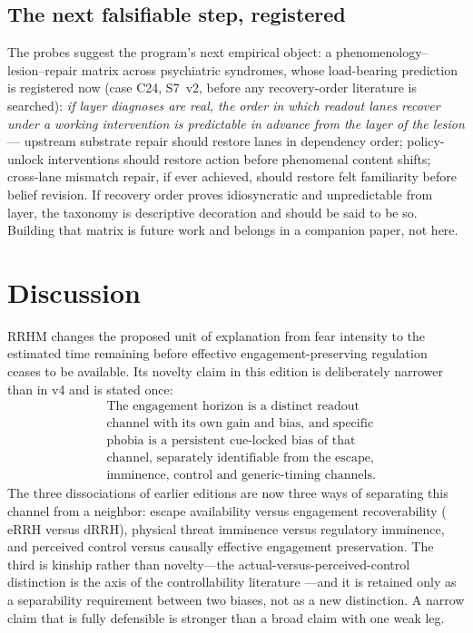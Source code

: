 \documentclass[9pt,twocolumn]{article}
\newcommand{\eRRH}{\mathrm{eRRH}}
\newcommand{\dRRH}{\mathrm{dRRH}}
\begin{document}
\subsection{The next falsifiable step, registered}
The probes suggest the program's next empirical object: a phenomenology--lesion--repair matrix across psychiatric syndromes, whose load-bearing prediction is registered now (case C24, S7~v2, before any recovery-order literature is searched): \emph{if layer diagnoses are real, the order in which readout lanes recover under a working intervention is predictable in advance from the layer of the lesion} --- upstream substrate repair should restore lanes in dependency order; policy-unlock interventions should restore action before phenomenal content shifts; cross-lane mismatch repair, if ever achieved, should restore felt familiarity before belief revision. If recovery order proves idiosyncratic and unpredictable from layer, the taxonomy is descriptive decoration and should be said to be so. Building that matrix is future work and belongs in a companion paper, not here.

\section{Discussion}
RRHM changes the proposed unit of explanation from fear intensity to the estimated time remaining before effective engagement-preserving regulation ceases to be available. Its novelty claim in this edition is deliberately narrower than in v4 and is stated once:
\[
\boxed{
\begin{aligned}
&\text{The engagement horizon is a distinct readout}\\[-0.1em]
&\text{channel with its own gain and bias, and specific}\\[-0.1em]
&\text{phobia is a persistent cue-locked bias of that}\\[-0.1em]
&\text{channel, separately identifiable from the escape,}\\[-0.1em]
&\text{imminence, control and generic-timing channels.}
\end{aligned}}
\]
The three dissociations of earlier editions are now three ways of separating this channel from a neighbor: escape availability versus engagement recoverability ($\eRRH$ versus $\dRRH$), physical threat imminence versus regulatory imminence, and perceived control versus causally effective engagement preservation. The third is kinship rather than novelty---the actual-versus-perceived-control distinction is the axis of the controllability literature \cite{maier2016}---and it is retained only as a separability requirement between two biases, not as a new distinction. A narrow claim that is fully defensible is stronger than a broad claim with one weak leg.
\end{document}
